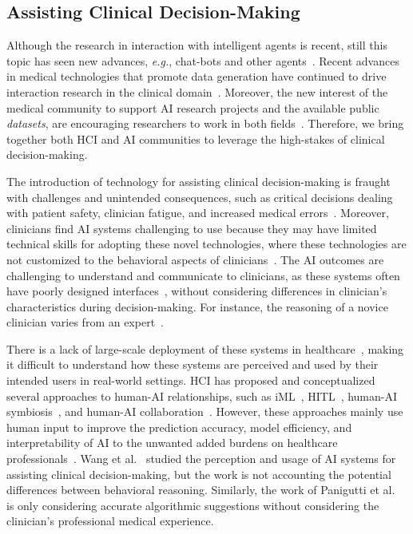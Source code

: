 \subsection{Assisting Clinical Decision-Making}
\label{sec:app005003002}

Although the research in interaction with intelligent agents is recent, still this topic has seen new advances, {\it e.g.}, chat-bots and other agents~\cite{miller2019intrinsically}.
Recent advances in medical technologies that promote data generation have continued to drive interaction research in the clinical domain~\cite{azuaje2019artificial, Lopes:2017:UHC:3143820.3144118}.
Moreover, the new interest of the medical community to support \ac{AI} research projects and the available public {\it datasets}, are encouraging researchers to work in both fields~\cite{lau2018dataset}.
Therefore, we bring together both \ac{HCI} and \ac{AI} communities to leverage the high-stakes of clinical decision-making.

The introduction of technology for assisting clinical decision-making is fraught with challenges and unintended consequences, such as critical decisions dealing with patient safety, clinician fatigue, and increased medical errors~\cite{10.1093/jamia/ocab291, 10.1117/12.2613082, doi:10.1148/radiol.212631}.
Moreover, clinicians find \ac{AI} systems challenging to use because they may have limited technical skills for adopting these novel technologies, where these technologies are not customized to the behavioral aspects of clinicians~\cite{CALISTO2022102922}.
The \ac{AI} outcomes are challenging to understand and communicate to clinicians, as these systems often have poorly designed interfaces~\cite{10.1145/3555157}, without considering differences in clinician's characteristics during decision-making.
For instance, the reasoning of a novice clinician varies from an expert~\cite{Edgar2022}.

There is a lack of large-scale deployment of these systems in healthcare~\cite{10.1145/3411764.3445432, SU202328, ZAPPATORE20231}, making it difficult to understand how these systems are perceived and used by their intended users in real-world settings.
\ac{HCI} has proposed and conceptualized several approaches to human-AI relationships, such as \ac{iML}~\cite{10.1145/3544548.3580682}, \ac{HITL}~\cite{10.1145/3397481.3450668}, human-\ac{AI} symbiosis~\cite{JARRAHI2018577}, and human-\ac{AI} collaboration~\cite{10.1145/3411764.3445432}.
However, these approaches mainly use human input to improve the prediction accuracy, model efficiency, and interpretability of \ac{AI} to the unwanted added burdens on healthcare professionals~\cite{10.1145/3555157, 10.1145/3397481.3450668}.
Wang et al.~\cite{10.1145/3411764.3445432} studied the perception and usage of \ac{AI} systems for assisting clinical decision-making, but the work is not accounting the potential differences between behavioral reasoning.
Similarly, the work of Panigutti et al.~\cite{10.1145/3491102.3502104} is only considering accurate algorithmic suggestions without considering the clinician's professional medical experience.

